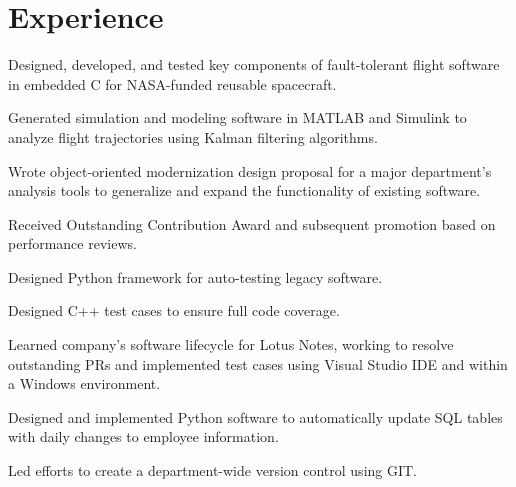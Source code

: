 \documentclass[11pt]{deedy-resume-openfont}
\begin{document}
\hfill
\begin{minipage}[t]{0.66\textwidth} 


\section{Experience}

\vspace{\topsep} %
\begin{tightemize}
\item Designed, developed, and tested key components of fault-tolerant flight software in embedded C for NASA-funded reusable spacecraft.  
\item Generated simulation and modeling software in MATLAB and Simulink to analyze flight trajectories using Kalman filtering algorithms. 
\item Wrote object-oriented modernization design proposal for a major department’s analysis tools to generalize and expand the functionality of existing software.  
\item Received Outstanding Contribution Award and subsequent promotion based on performance reviews.
\item Designed Python framework for auto-testing legacy software. 
\end{tightemize}
\sectionsep

\vspace{\topsep} 
\vspace{\topsep} 

\begin{tightemize}
\item Designed C++ test cases to ensure full code coverage. 
\item Learned company’s software lifecycle for Lotus Notes, working to resolve outstanding PRs and implemented test cases using Visual Studio IDE and within a Windows environment.
\end{tightemize}
\sectionsep

\vspace{\topsep} 
\vspace{\topsep} 

\begin{tightemize}
\item Designed and implemented Python software to automatically update SQL tables with daily changes to employee information. 
\item Led efforts to create a department-wide version control using GIT. 
\end{tightemize}
\sectionsep


\end{minipage}
\end{document}
